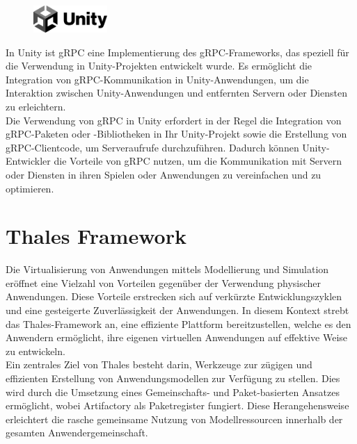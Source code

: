 
\begin{figure} %
    \centering
    \includegraphics[width=0.25\textwidth]{images/Unity_2021.svg.png}
\end{figure}

In Unity ist gRPC eine Implementierung des gRPC-Frameworks, das speziell für die Verwendung in Unity-Projekten entwickelt wurde. Es ermöglicht die Integration von gRPC-Kommunikation in Unity-Anwendungen, um die Interaktion zwischen Unity-Anwendungen und entfernten Servern oder Diensten zu erleichtern.\\

Die Verwendung von gRPC in Unity erfordert in der Regel die Integration von gRPC-Paketen oder -Bibliotheken in Ihr Unity-Projekt sowie die Erstellung von gRPC-Clientcode, um Serveraufrufe durchzuführen. Dadurch können Unity-Entwickler die Vorteile von gRPC nutzen, um die Kommunikation mit Servern oder Diensten in ihren Spielen oder Anwendungen zu vereinfachen und zu optimieren.\\

\section{Thales Framework}
Die Virtualisierung von Anwendungen mittels Modellierung und Simulation eröffnet eine Vielzahl von Vorteilen gegenüber der Verwendung physischer Anwendungen. Diese Vorteile erstrecken sich auf verkürzte Entwicklungszyklen und eine gesteigerte Zuverlässigkeit der Anwendungen. In diesem Kontext strebt das Thales-Framework an, eine effiziente Plattform bereitzustellen, welche es den Anwendern ermöglicht, ihre eigenen virtuellen Anwendungen auf effektive Weise zu entwickeln.\\

Ein zentrales Ziel von Thales besteht darin, Werkzeuge zur zügigen und effizienten Erstellung von Anwendungsmodellen zur Verfügung zu stellen. Dies wird durch die Umsetzung eines Gemeinschafts- und Paket-basierten Ansatzes ermöglicht, wobei Artifactory als Paketregister fungiert. Diese Herangehensweise erleichtert die rasche gemeinsame Nutzung von Modellressourcen innerhalb der gesamten Anwendergemeinschaft.\\

